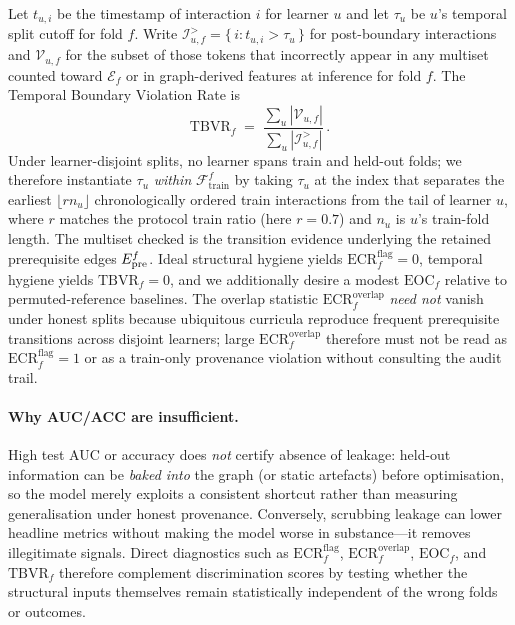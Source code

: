 Let $t_{u,i}$ be the timestamp of interaction $i$ for learner $u$ and
let $\tau_u$ be $u$'s temporal split cutoff for fold $f$. Write
$\mathcal{I}_{u,f}^{>}=\{\, i : t_{u,i}>\tau_u \,\}$ for post-boundary
interactions and $\mathcal{V}_{u,f}$ for the subset of those tokens that
incorrectly appear in any multiset counted toward $\mathcal{E}_f$ or in
graph-derived features at inference for fold $f$. The Temporal
Boundary Violation Rate is
\begin{equation}
\mathrm{TBVR}_f \;=\;
\frac{\sum_u |\mathcal{V}_{u,f}|}{\sum_u |\mathcal{I}_{u,f}^{>}|}\,.
\label{eq:tbvr}
\end{equation}
Under learner-disjoint splits, no learner spans train and held-out folds;
we therefore instantiate $\tau_u$ \emph{within}
$\mathcal{F}_{\text{train}}^f$ by taking $\tau_u$ at the index that
separates the earliest $\lfloor r n_u\rfloor$ chronologically ordered
train interactions from the tail of learner $u$, where $r$ matches the
protocol train ratio (here $r{=}0.7$) and $n_u$ is $u$'s train-fold length.
The multiset checked is the transition evidence underlying the retained
prerequisite edges $E_{\text{pre}}^f$.
Ideal structural hygiene yields $\mathrm{ECR}^{\mathrm{flag}}_f{=}0$, temporal hygiene yields $\mathrm{TBVR}_f{=}0$, and we additionally desire a modest $\mathrm{EOC}_f$ relative to permuted-reference baselines.
The overlap statistic $\mathrm{ECR}^{\mathrm{overlap}}_f$ \emph{need not} vanish under honest splits because ubiquitous curricula reproduce frequent prerequisite transitions across disjoint learners; large $\mathrm{ECR}^{\mathrm{overlap}}_f$ therefore must not be read as $\mathrm{ECR}^{\mathrm{flag}}_f{=}1$ or as a train-only provenance violation without consulting the audit trail.

\paragraph{Why AUC/ACC are insufficient.}
High test AUC or accuracy does \emph{not} certify absence of leakage:
held-out information can be \emph{baked into} the graph (or static
artefacts) before optimisation, so the model merely exploits a
consistent shortcut rather than measuring generalisation under honest
provenance. Conversely, scrubbing leakage can lower headline metrics
without making the model worse in substance---it removes illegitimate
signals. Direct diagnostics such as $\mathrm{ECR}^{\mathrm{flag}}_f$, $\mathrm{ECR}^{\mathrm{overlap}}_f$, $\mathrm{EOC}_f$,
and $\mathrm{TBVR}_f$ therefore complement discrimination scores by
testing whether the structural inputs themselves remain statistically
independent of the wrong folds or outcomes.
